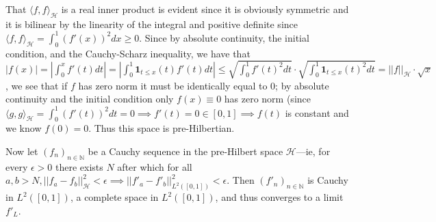 \documentclass[12pt]{article}
\begin{document}
That $\langle f, f \rangle_{\mathcal{H}}$ is a real inner product is evident since it is obviously symmetric and it is bilinear by the linearity of the integral and positive definite since $\langle f, f \rangle_{\mathcal{H}} = \int_{0}^1 (f'(x))^2 dx \geq 0$. Since by absolute continuity, the initial condition, and the Cauchy-Scharz inequality, we have that $|f(x)| = |\int_0^x f'(t)dt| = |\int_0^1 \mathbf{1}_{t\leq x}(t) f'(t) dt| \leq \sqrt{\int_0^1 f'(t)^2 dt} \cdot \sqrt{\int_0^1 \mathbf{1}_{t \leq x}(t)^2 dt}= ||f||_{\mathcal{H}} \cdot \sqrt{x}$, we see that if $f$ has zero norm it must be identically equal to 0; by absolute continuity and the initial condition only $f(x) \equiv 0$ has zero norm (since $\langle g, g \rangle_\mathcal{H} = \int_0^1 (f'(t))^2 dt = 0 \implies f'(t) = 0 \in [0,1] \implies f(t)$ is constant and we know $f(0) = 0$. Thus this space is pre-Hilbertian.

Now let $(f_n)_{n \in \mathbb{N}}$ be a Cauchy sequence in the pre-Hilbert space $\mathcal{H}$---ie, for every $\epsilon > 0$ there exists $N$ after which for all $a, b > N, ||f_a - f_b||^2_\mathcal{H} < \epsilon \implies ||f'_a - f'_b||^2_{L^2([0,1])} < \epsilon.$ Then $(f'_n)_{n \in \mathbb{N}}$ is Cauchy in $L^2([0,1])$, a complete space in $L^2([0,1])$, and thus converges to a limit $f'_L$.
\end{document}
